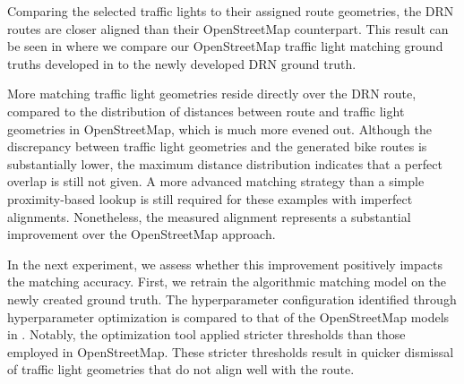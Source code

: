 Comparing the selected traffic lights to their assigned route geometries, the DRN routes are closer aligned than their OpenStreetMap counterpart. This result can be seen in  where we compare our OpenStreetMap traffic light matching ground truths developed in  to the newly developed DRN ground truth. 

More matching traffic light geometries reside directly over the DRN route, compared to the distribution of distances between route and traffic light geometries in OpenStreetMap, which is much more evened out. Although the discrepancy between traffic light geometries and the generated bike routes is substantially lower, the maximum distance distribution indicates that a perfect overlap is still not given. A more advanced matching strategy than a simple proximity-based lookup is still required for these examples with imperfect alignments. Nonetheless, the measured alignment represents a substantial improvement over the OpenStreetMap approach. 

\begin{table}[b]
\caption{Retrained model thresholds on the new routing.}
\label{tab:hyperparameter-tuning-results-drn}
\end{table}

In the next experiment, we assess whether this improvement positively impacts the matching accuracy. First, we retrain the algorithmic matching model on the newly created ground truth. The hyperparameter configuration identified through hyperparameter optimization is compared to that of the OpenStreetMap models in . Notably, the optimization tool applied stricter thresholds than those employed in OpenStreetMap. These stricter thresholds result in quicker dismissal of traffic light geometries that do not align well with the route.

